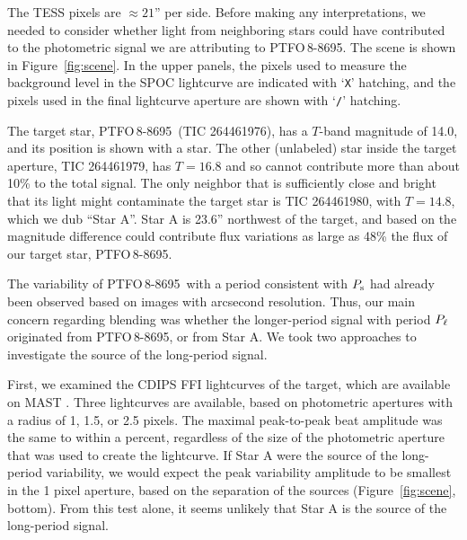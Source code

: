 \documentclass[12pt,twocolumn,tighten]{aastex62}
\newcommand{\ptfo}{PTFO$\,$8-8695}
\begin{document}
The TESS pixels are $\approx21$'' per side. Before making any
interpretations, we needed to consider whether light from
neighboring stars could have contributed to the photometric signal
we are attributing to \ptfo. The scene is
shown in Figure~\ref{fig:scene}.  In the upper panels, the pixels used
to measure the background level in the SPOC lightcurve are indicated
with `\texttt{X}' hatching, and the pixels used in the final
lightcurve aperture are shown with `\texttt{/}' hatching.

The target star, \ptfo\ (TIC 264461976), has a $T$-band magnitude of
14.0, and its position is shown with a star.  The other (unlabeled)
star inside the target aperture, TIC 264461979, has $T=16.8$ and so
cannot contribute more than about 10\% to the total signal.  The only
neighbor that is sufficiently close and bright that its light might
contaminate the target star is TIC 264461980, with $T=14.8$, which we
dub ``Star A''.  Star A is 23.6'' northwest of the target, and based on the
magnitude difference could contribute flux variations as large as 48\% the flux of our
target star, \ptfo.  

The variability of \ptfo\ with a period consistent with $P_{\rm s}$ had already been observed
based on images with arcsecond resolution.
Thus, our main concern regarding blending
was whether 
the longer-period signal with period $P_{\rm \ell}$ originated from \ptfo,
or from Star A. We took two approaches to investigate the source of the long-period
signal.

First, we examined the CDIPS FFI lightcurves of the target, which are
available on MAST \citep{bouma_cluster_2019}. Three lightcurves are available,
based on photometric apertures with a radius of 1, 1.5, or 2.5 pixels. The maximal
peak-to-peak beat amplitude was the same to within a percent,
regardless of the size of the photometric
aperture that was used to create the lightcurve.  If Star A
were the source of the long-period variability, we would expect the
peak variability amplitude to be smallest in the 1 pixel aperture,
based on the separation of the sources (Figure~\ref{fig:scene},
bottom).  From this test alone, it seems unlikely that Star A is the
source of the long-period signal.
\end{document}
